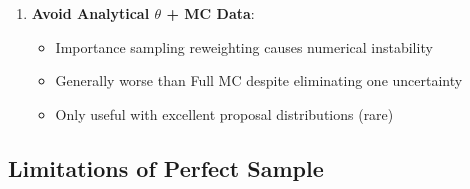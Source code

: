 \begin{enumerate}
\begin{itemize}
\item \textbf{Examples}: Complex hierarchical models, neural network posteriors
\end{itemize}
\item \textbf{Avoid Analytical $\theta$ + MC Data}:
\begin{itemize}
\item Importance sampling reweighting causes numerical instability
\item Generally worse than Full MC despite eliminating one uncertainty
\item Only useful with excellent proposal distributions (rare)
\end{itemize}
\end{enumerate}

\subsection{Limitations of Perfect Sample}

